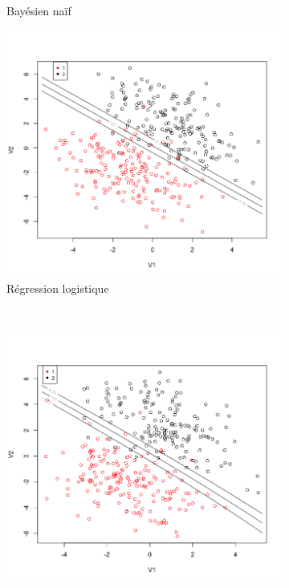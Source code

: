 \documentclass[a4paper,10pt]{report}
\begin{document}
\begin{figure}[H]
\begin{subfigure}[b]{0.45\linewidth}
		\caption{\small Bayésien naïf}
		\label{fig:front-decision-synth-3-nba}%
	\end{subfigure}%
	\begin{subfigure}[b]{0.45\linewidth}
		\centering
		\captionsetup{justification=centering, margin=1cm}
		\includegraphics[width=1\linewidth]{img/front-decision-synth-3-reg-log}
		\caption{\small Régression logistique}
		\label{fig:front-decision-synth-3-reg-log}%
	\end{subfigure}\\%
	\begin{subfigure}[b]{0.45\linewidth}
		\centering
		\captionsetup{justification=centering, margin=1cm}
		\includegraphics[width=1\linewidth]{img/front-decision-synth-3-reg-log-quad}

\end{subfigure}
\end{figure}
\end{document}

